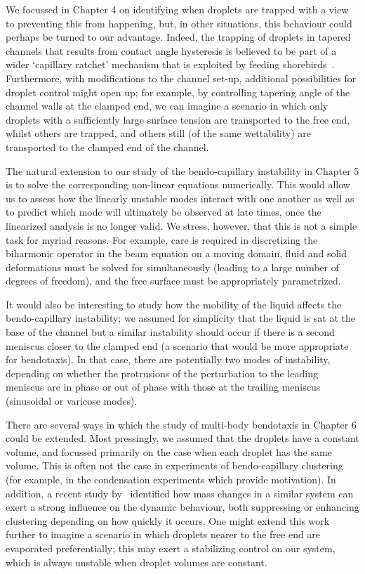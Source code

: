 We focussed in Chapter 4 on identifying when droplets are trapped with a view to preventing this from happening, but, in other situations, this behaviour could perhaps be turned to our advantage. Indeed,  the trapping of droplets in tapered channels that results from contact angle hysteresis is believed to be part of a wider `capillary ratchet' mechanism that is exploited by feeding shorebirds~\citep{Prakash2008Science}. Furthermore, with modifications to the channel set-up, additional possibilities for droplet control might open up; for example, by controlling tapering angle of the channel walls at the clamped end, we can imagine a scenario in which only droplets with a sufficiently large surface tension are transported to the free end, whilst others are trapped, and others still (of the same wettability) are transported to the clamped end of the channel.

The natural extension to our study of the bendo-capillary instability in Chapter 5 is to solve the corresponding non-linear equations numerically. This would allow us to assess how the linearly unstable modes interact with one another as well as to predict which mode will ultimately be observed at late times, once the linearized analysis is no longer valid. We stress, however, that this is not a simple task for myriad reasons. For example, care is required in discretizing the biharmonic operator in the beam equation on a moving domain, fluid and solid deformations must be solved for simultaneously (leading to a large number of degrees of freedom), and the free surface must be appropriately parametrized.

It would also be interesting to study how the mobility of the liquid affects the bendo-capillary instability; we assumed for simplicity that the liquid is sat at the base of the channel but a similar instability should occur if there is a second meniscus closer to the clamped end (a scenario that would be more appropriate for bendotaxis). In that case, there are potentially two modes of instability, depending on whether the protrusions of the perturbation to the leading meniscus are in phase or out of phase with those at the trailing meniscus (sinusoidal or varicose modes). 

There are several ways in which the study of multi-body bendotaxis in Chapter 6 could be extended. Most pressingly, we assumed that the droplets have a constant volume, and focussed primarily on the case when each droplet has the same volume. This is often not the case in experiments of bendo-capillary clustering (for example, in the condensation experiments which provide motivation). In addition, a recent study by~\cite{Hadjittofis2016JFM} identified how mass changes in a similar system can exert a strong influence on the dynamic behaviour, both suppressing or enhancing clustering depending on how quickly it occurs. One might extend this work further to imagine a scenario in which droplets nearer to the free end are evaporated preferentially; this may exert a stabilizing control on our system, which is always unstable when droplet volumes are constant. 

